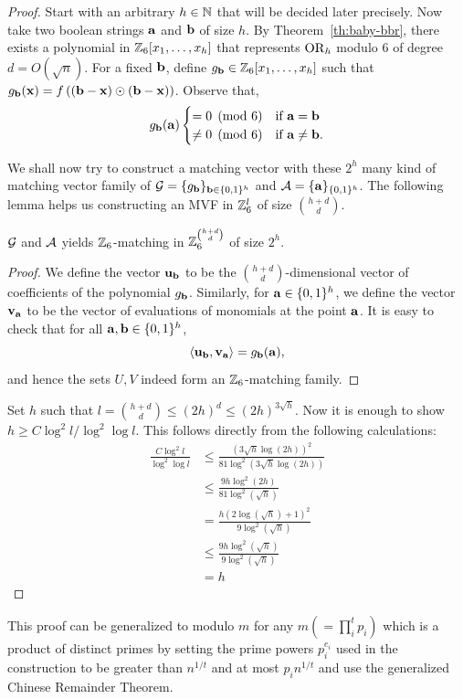 \begin{proof}
    Start with an arbitrary $h\in\mathbb{N}$ that will be decided later precisely. Now take two boolean strings $\mathbf{a}$ and $\mathbf{b}$ of size $h$. By Theorem~\ref{th:baby-bbr}, there exists a polynomial in $\mathbb{Z}_6[x_1,\ldots,x_h]$ that represents $\operatorname{OR}_h$ modulo $6$ of degree $d = O(\sqrt{n})$. For a fixed $\mathbf{b}$, define $g_{\mathbf{b}}\in\mathbb{Z}_6[x_1,\ldots,x_h]$ such that $g_{\mathbf{b}}(\mathbf{x}) = f\left((\mathbf{b}-\mathbf{x})\odot(\mathbf{b}-\mathbf{x})\right)$. Observe that,
    \[
        g_{\mathbf{b}}(\mathbf{a}) \begin{cases} = 0 \pmod{6} & \text{if } \mathbf{a} = \mathbf{b} \\ \neq 0 \pmod{6} & \text{if } \mathbf{a} \neq \mathbf{b}. \end{cases}
    \]

    We shall now try to construct a matching vector with these $2^h$ many kind of matching vector family of $\mathcal{G} = \{g_{\mathbf{b}}\}_{\mathbf{b}\in\{0,1\}^h}$ and $\mathcal{A} = \{\mathbf{a}\}_{\{0,1\}^h}$. The following lemma helps us constructing an MVF in $\mathbb{Z}_6^l$ of size $\binom{h+d}{d}$.

\begin{greybox}
    \begin{lemma}
\label{lem:poly-match}
$\mathcal{G}$ and $\mathcal{A}$ yields $\mathbb{Z}_6$-matching in $\mathbb{Z}_6^{\binom{h+d}{d}}$ of size $2^h$.
\end{lemma}
\end{greybox}

\begin{proof}
We define the vector $\mathbf{u}_{\mathbf{b}}$ to be the $\binom{h+d}{d}$-dimensional vector of coefficients of the polynomial $g_{\mathbf{b}}$. Similarly, for $\mathbf{a}\in\{0,1\}^h$, we define the vector $\mathbf{v}_{\mathbf{a}}$ to be the vector of evaluations of monomials at the point $\mathbf{a}$. It is easy to check that for all $\mathbf{a},\mathbf{b} \in \{0,1\}^h$,
\[
\langle \mathbf{u}_{\mathbf{b}}, \mathbf{v}_{\mathbf{a}} \rangle = g_{\mathbf{b}}(\mathbf{a}),
\]
and hence the sets $U, V$ indeed form an $\mathbb{Z}_6$-matching family.
\end{proof}

Set $h$ such that $l = \binom{h+d}{d}\leq (2h)^d\leq(2h)^{3\sqrt{h}}$. Now it is enough to show $ h \geq C\log^2 l/\log^2 \log l$.
This follows directly from the following calculations:
\begin{align*}
 \frac{C\log^2 l}{\log^2 \log l} 
&\leq \frac{\left(3\sqrt{h} \log(2h)\right)^2}{81 \log^2\left(3\sqrt{h} \log(2h)\right)} \\
&\leq \frac{9h \log^2(2h)}{81 \log^2(\sqrt{h})} \\
&= \frac{h \left(2\log(\sqrt{h}) + 1\right)^2}{9 \log^2(\sqrt{h})} \\
&\leq \frac{9h \log^2(\sqrt{h})}{9 \log^2(\sqrt{h})} \\
&= h
\end{align*}
\end{proof}

This proof can be generalized to modulo $m$ for any $m \left(= \prod_i^t p_i\right)$ which is a product of distinct primes by setting the prime powers $p_i^{e_i}$ used in the construction to be greater than $n^{1/t}$ and at most $p_i n^{1/t}$ and use the generalized Chinese Remainder Theorem.
